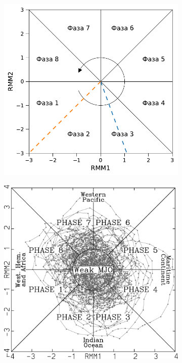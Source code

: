 \begin{figure}
    \centering  
    \begin{subfigure}[tb]{.45\textwidth}
		\includegraphics[width=\textwidth]{figures/rmm_diagram.pdf}
		\caption{}
		\label{fig:rmm_diagram}
	\end{subfigure}
	\hfill
	\begin{subfigure}[tb]{.45\textwidth}
		\includegraphics[width=\textwidth]{figures/wh04_fig7.png}

\end{subfigure}
\end{figure}
